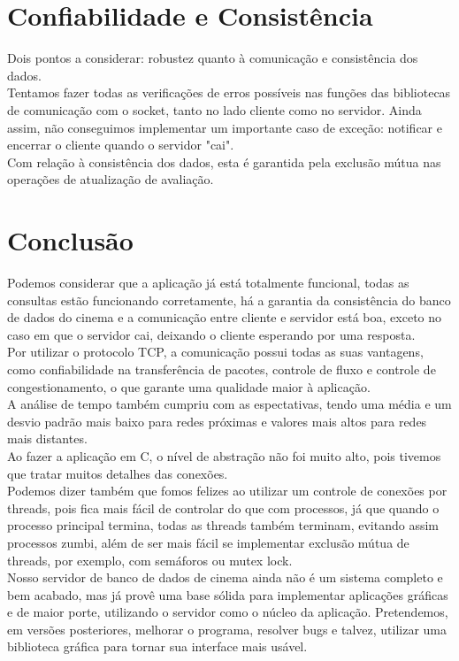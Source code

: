 \documentclass[11pt,twoside]{article}
\begin{document}
\section{Confiabilidade e Consistência}
Dois pontos a considerar: robustez quanto à comunicação e consistência dos dados.\\
Tentamos fazer todas as verificações de erros possíveis nas funções das bibliotecas de comunicação com o socket, tanto no lado cliente como no servidor. Ainda assim, não conseguimos implementar um importante caso de exceção: notificar e encerrar o cliente quando o servidor "cai".\\
Com relação à consistência dos dados, esta é garantida pela exclusão mútua nas operações de atualização de avaliação.

\section{Conclusão}
Podemos considerar que a aplicação já está totalmente funcional, todas as consultas estão funcionando corretamente, há a garantia da consistência do banco de dados do cinema e a comunicação entre cliente e servidor está boa, exceto no caso em que o servidor cai, deixando o cliente esperando por uma resposta.\\
Por utilizar o protocolo TCP, a comunicação possui todas as suas vantagens, como confiabilidade na transferência de pacotes, controle de fluxo e controle de congestionamento, o que garante uma qualidade maior à aplicação.\\
A análise de tempo também cumpriu com as espectativas, tendo uma média e um desvio padrão mais baixo para redes próximas e valores mais altos para redes mais distantes.\\
Ao fazer a aplicação em C, o nível de abstração não foi muito alto, pois tivemos que tratar muitos detalhes das conexões.\\
Podemos dizer também que fomos felizes ao utilizar um controle de conexões por threads, pois fica mais fácil de controlar do que com processos, já que quando o processo principal termina, todas as threads também terminam, evitando assim processos zumbi, além de ser mais fácil se implementar exclusão mútua de threads, por exemplo, com semáforos ou mutex lock.\\
Nosso servidor de banco de dados de cinema ainda não é um sistema completo e bem acabado, mas já provê uma base sólida para implementar aplicações gráficas e de maior porte, utilizando o servidor como o núcleo da aplicação. Pretendemos, em versões posteriores, melhorar o programa, resolver bugs e talvez, utilizar uma biblioteca gráfica para tornar sua interface mais usável. 
\end{document}
